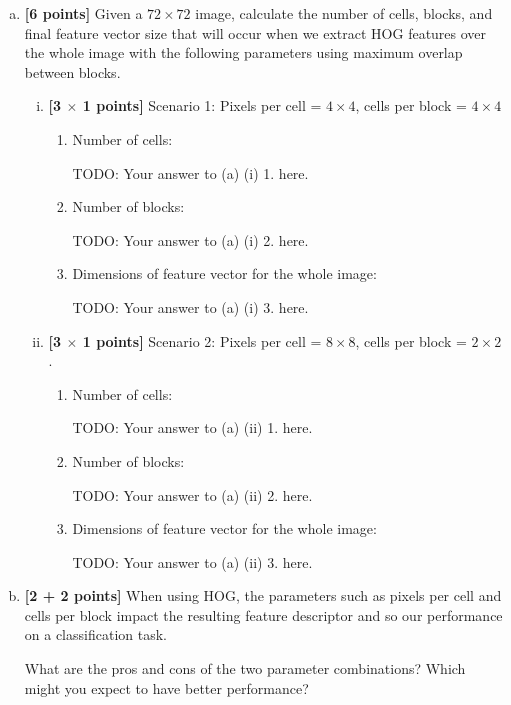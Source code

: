 \begin{enumerate}[(a)]
\item \textbf{[6 points]} Given a $72\times72$ image, calculate the number of cells, blocks, and final feature vector size that will occur when we extract HOG features over the whole image with the following parameters using maximum overlap between blocks.

\begin{enumerate}[(i)]
    \item \textbf{[3 $\times$ 1 points]}
Scenario 1: Pixels per cell = $4\times4$, cells per block = $4\times4$ %

\begin{enumerate}[1.]
    \item 
Number of cells: 
\begin{mdframed}
TODO: Your answer to (a) (i) 1. here.
\end{mdframed}
    \item 
Number of blocks: 
\begin{mdframed}
TODO: Your answer to (a) (i) 2. here.
\end{mdframed}
    \item 
Dimensions of feature vector for the whole image: 
\begin{mdframed}
TODO: Your answer to (a) (i) 3. here.
\end{mdframed}
\end{enumerate}

\item \textbf{[3 $\times$ 1 points]}
Scenario 2: Pixels per cell = $8\times8$, cells per block = $2\times2$.
\begin{enumerate}[1.]
    \item 
Number of cells: 
\begin{mdframed}
TODO: Your answer to (a) (ii) 1. here.
\end{mdframed}
    \item 
Number of blocks: 
\begin{mdframed}
TODO: Your answer to (a) (ii) 2. here.
\end{mdframed}
    \item 
Dimensions of feature vector for the whole image: 
\begin{mdframed}
TODO: Your answer to (a) (ii) 3. here.
\end{mdframed}
\end{enumerate}
\end{enumerate}

\item \textbf{[2 + 2 points]}
When using HOG, the parameters such as pixels per cell and cells per block impact the resulting feature descriptor and so our performance on a classification task.

What are the pros and cons of the two parameter combinations? Which might you expect to have better performance?
\end{enumerate}

